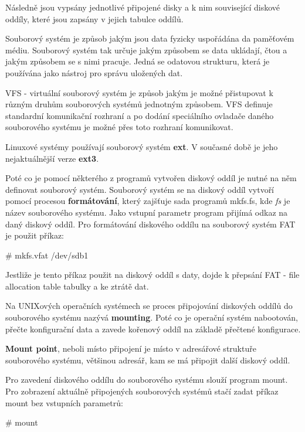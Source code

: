 Následně jsou vypsány jednotlivé připojené disky a k nim související diskové oddíly, které jsou zapsány v jejich tabulce oddílů.


Souborový systém je způsob jakým jsou data fyzicky uspořádána da paměťovém médiu. Souborový systém tak určuje jakým způsobem se data ukládají, čtou a jakým způsobem se s nimi pracuje. Jedná se odatovou strukturu, která je používána jako nástroj pro správu uložených dat.

VFS - virtuální souborový systém je způsob jakým je možné přistupovat k různým druhům souborových systémů jednotným způsobem. VFS definuje standardní komunikační rozhraní a po dodání speciálního ovladače daného souborového systému je možné přes toto rozhraní komunikovat.

Linuxové systémy používají souborový systém {\bf ext}. V současné době je jeho nejaktuálnější verze {\bf ext3}.


Poté co je pomocí některého z programů vytvořen diskový oddíl je nutné na něm definovat souborový systém. Souborový systém se na diskový oddíl vytvoří pomocí procesou {\bf formátování}, který zajšťuje sada programů mkfs.fs, kde {\it fs} je název souborového systému. Jako vstupní parametr program přijímá odkaz na daný diskový oddíl. Pro formátování diskového oddílu na souborový systém FAT je použit příkaz:

\vskip 4mm
{\verbatim
# mkfs.vfat /dev/sdb1
}
\vskip 4mm

Jestliže je tento příkaz použit na diskový oddíl s daty, dojde k přepsání FAT - file allocation table tabulky a ke ztrátě dat.


Na UNIXových operačních systémech se proces připojování diskových oddílů do souborového systému nazývá {\bf mounting}. Poté co je operační systém nabootován, přečte konfigurační data a zavede kořenový oddíl na základě přečtené konfigurace.

{\bf Mount point}, neboli místo připojení je místo v adresářové struktuře souborového systému, většinou adresář, kam se má připojit další diskový oddíl.

Pro zavedení diskového oddílu do souborového systému slouží program mount. Pro zobrazení aktuálně připojených souborových systémů stačí zadat příkaz mount bez vstupních parametrů:

\vskip 4mm
{\verbatim
# mount
}
\vskip 4mm

